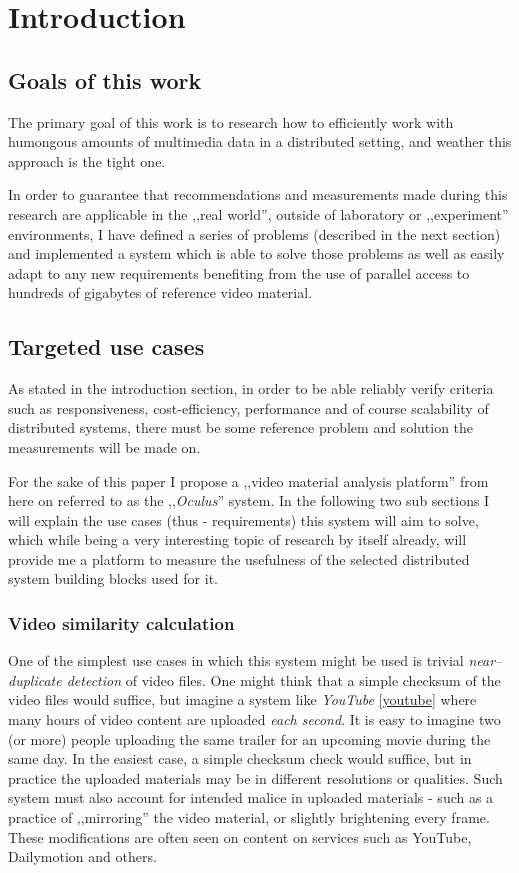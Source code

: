 \chapter{Introduction}



\section{Goals of this work}
The primary goal of this work is to research how to efficiently work with humongous amounts of multimedia data in a distributed setting, and weather this approach is the tight one.

In order to guarantee that recommendations and measurements made during this research are applicable in the ,,real world'', outside of laboratory or ,,experiment'' environments, I have defined a series of problems (described in the next section) and implemented a system which is able to solve those problems as well as easily adapt to any new requirements benefiting from the use of parallel access to hundreds of gigabytes of reference video material.

\section{Targeted use cases}

As stated in the introduction section, in order to be able reliably verify criteria such as responsiveness, cost-efficiency, performance and of course scalability of distributed systems, there must be some reference problem and solution the measurements will be made on. 

For the sake of this paper I propose a ,,video material analysis platform'' from here on referred to as the ,,\textit{Oculus}'' system.
In the following two sub sections I will explain the use cases (thus - requirements) this system will aim to solve, which while being a very interesting 
topic of research by itself already, will provide me a platform to measure the usefulness of the selected distributed system building blocks used for it. 

\subsection{Video similarity calculation}
One of the simplest use cases in which this system might be used is trivial \textit{near--duplicate detection} of video files.
One might think that a simple checksum of the video files would suffice, but imagine a system like \textit{YouTube} \ref{youtube} where many hours of video content are uploaded \textit{each second}. It is easy to imagine two (or more) people uploading the same trailer for an upcoming movie during the same day. In the easiest case, a simple checksum check would suffice, but in practice the uploaded materials may be in different resolutions or qualities. Such system must also account for intended malice in uploaded materials - such as a practice of ,,mirroring'' the video material, or slightly brightening every frame. These modifications are often seen on content on services such as YouTube, Dailymotion and others.

